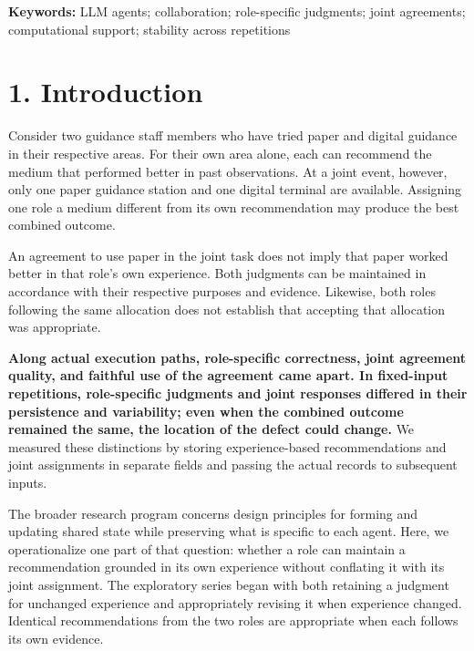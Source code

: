 \documentclass[10pt,a4paper]{article}
\begin{document}
\textbf{Keywords:} LLM agents; collaboration; role-specific judgments; joint agreements; computational support; stability across repetitions

\clearpage

\section{1. Introduction}\label{paper-03-introduction}

Consider two guidance staff members who have tried paper and digital guidance in their respective areas. For their own area alone, each can recommend the medium that performed better in past observations. At a joint event, however, only one paper guidance station and one digital terminal are available. Assigning one role a medium different from its own recommendation may produce the best combined outcome.

An agreement to use paper in the joint task does not imply that paper worked better in that role's own experience. Both judgments can be maintained in accordance with their respective purposes and evidence. Likewise, both roles following the same allocation does not establish that accepting that allocation was appropriate.

\textbf{Along actual execution paths, role-specific correctness, joint agreement quality, and faithful use of the agreement came apart. In fixed-input repetitions, role-specific judgments and joint responses differed in their persistence and variability; even when the combined outcome remained the same, the location of the defect could change.} We measured these distinctions by storing experience-based recommendations and joint assignments in separate fields and passing the actual records to subsequent inputs.

The broader research program concerns design principles for forming and updating shared state while preserving what is specific to each agent. Here, we operationalize one part of that question: whether a role can maintain a recommendation grounded in its own experience without conflating it with its joint assignment. The exploratory series began with both retaining a judgment for unchanged experience and appropriately revising it when experience changed. Identical recommendations from the two roles are appropriate when each follows its own evidence.
\end{document}
